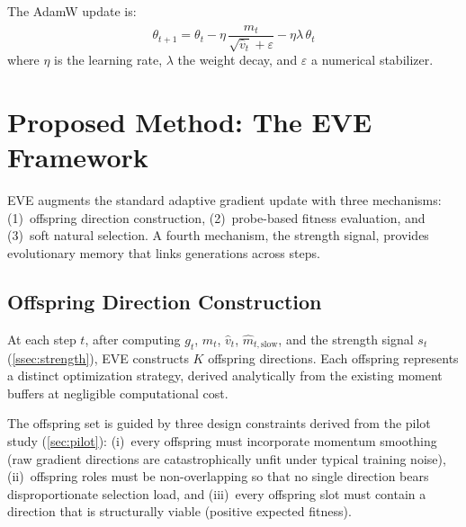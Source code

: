\documentclass[12pt]{article}
\begin{document}
The AdamW update is:
\begin{equation}
  \theta_{t+1} = \theta_t
    - \eta\,\frac{\hat{m}_t}{\sqrt{\hat{v}_t} + \varepsilon}
    - \eta\lambda\,\theta_t
  \label{eq:adamw}
\end{equation}
where $\eta$ is the learning rate, $\lambda$ the weight decay, and
$\varepsilon$ a numerical stabilizer.


\section{Proposed Method: The EVE Framework}
\label{sec:method}

EVE augments the standard adaptive gradient update with three mechanisms:
(1)~offspring direction construction, (2)~probe-based fitness evaluation,
and (3)~soft natural selection.
A fourth mechanism, the strength signal, provides evolutionary memory
that links generations across steps.

\subsection{Offspring Direction Construction}
\label{ssec:offspring}

At each step $t$, after computing $g_t$, $\hat{m}_t$, $\hat{v}_t$,
$\hat{m}_{t,\mathrm{slow}}$, and the strength signal $s_t$
(\cref{ssec:strength}), EVE constructs $K$ offspring directions.
Each offspring represents a distinct optimization strategy, derived
analytically from the existing moment buffers at negligible computational
cost.

The offspring set is guided by three design constraints derived from
the pilot study (\cref{sec:pilot}):
(i)~every offspring must incorporate momentum smoothing (raw gradient
directions are catastrophically unfit under typical training noise),
(ii)~offspring roles must be non-overlapping so that no single
direction bears disproportionate selection load, and
(iii)~every offspring slot must contain a direction that is
structurally viable (positive expected fitness).
\end{document}
